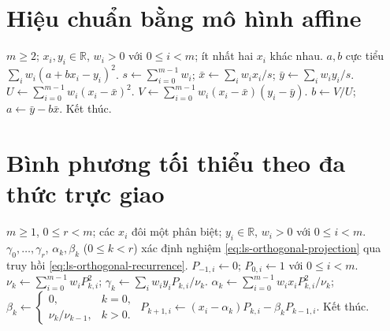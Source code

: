 \documentclass[12pt,a4paper,oneside]{book}
\numberwithin{algorithm}{chapter}
\theoremstyle{definition}
\newcommand{\R}{\mathbb{R}}
\begin{document}
\section{Hiệu chuẩn bằng mô hình affine}
\begin{algorithm}[H]
\caption{Hồi quy affine bằng tọa độ quy tâm}
\label{alg:ls-affine}
\begin{algorithmic}[1]
\Require $m\geq2$; $x_i,y_i\in\R$, $w_i>0$ với $0\leq i<m$; ít nhất hai $x_i$ khác nhau.
\Ensure $a,b$ cực tiểu $\sum_iw_i(a+bx_i-y_i)^2$.
\State $s\gets\sum_{i=0}^{m-1}w_i$; $\bar x\gets\sum_iw_ix_i/s$; $\bar y\gets\sum_iw_iy_i/s$.
\State $U\gets\sum_{i=0}^{m-1}w_i(x_i-\bar x)^2$.
\State $V\gets\sum_{i=0}^{m-1}w_i(x_i-\bar x)(y_i-\bar y)$.
\State $b\gets V/U$; $a\gets\bar y-b\bar x$.
\State Kết thúc.
\end{algorithmic}
\end{algorithm}

\section{Bình phương tối thiểu theo đa thức trực giao}
\begin{algorithm}[H]
\caption{Dựng cơ sở trực giao rời rạc và các hệ số chiếu}
\label{alg:ls-orthogonal}
\begin{algorithmic}[1]
\Require $m\geq1$, $0\leq r<m$; các $x_i$ đôi một phân biệt; $y_i\in\R$, $w_i>0$ với $0\leq i<m$.
\Ensure $\gamma_0,\ldots,\gamma_r$, $\alpha_k,\beta_k$ ($0\leq k<r$) xác định nghiệm \eqref{eq:ls-orthogonal-projection} qua truy hồi \eqref{eq:ls-orthogonal-recurrence}.
\State $P_{-1,i}\gets0$; $P_{0,i}\gets1$ với $0\leq i<m$.
  \State $\nu_k\gets\sum_{i=0}^{m-1}w_iP_{k,i}^2$; $\gamma_k\gets\sum_iw_iy_iP_{k,i}/\nu_k$.
    \State $\alpha_k\gets\sum_{i=0}^{m-1}w_ix_iP_{k,i}^2/\nu_k$; $\beta_k\gets\begin{cases}0,&k=0,\\\nu_k/\nu_{k-1},&k>0.\end{cases}$
      \State $P_{k+1,i}\gets(x_i-\alpha_k)P_{k,i}-\beta_kP_{k-1,i}$.
    \EndFor
  \EndIf
\EndFor
\Statex
\State Kết thúc.
\end{algorithmic}
\end{algorithm}

\end{document}
